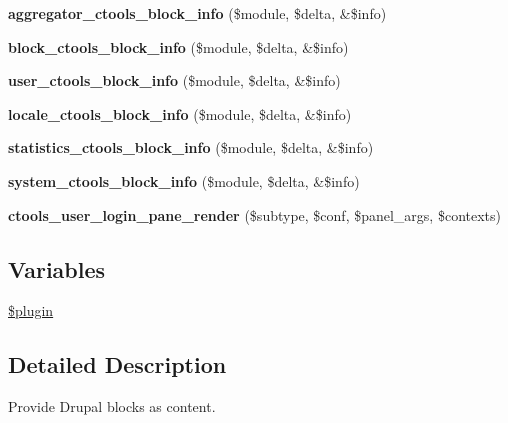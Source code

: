 \begin{DoxyCompactItemize}
\item 
\hypertarget{block_8inc_a992d4d1318e320a5face6478927e9ada}{
{\bfseries aggregator\_\-ctools\_\-block\_\-info} (\$module, \$delta, \&\$info)}
\label{block_8inc_a992d4d1318e320a5face6478927e9ada}

\item 
\hypertarget{block_8inc_a44b0d26408fd7468dee4d327a792536e}{
{\bfseries block\_\-ctools\_\-block\_\-info} (\$module, \$delta, \&\$info)}
\label{block_8inc_a44b0d26408fd7468dee4d327a792536e}

\item 
\hypertarget{block_8inc_a0e3dbebd519d5c357e2981cfcefa7aa4}{
{\bfseries user\_\-ctools\_\-block\_\-info} (\$module, \$delta, \&\$info)}
\label{block_8inc_a0e3dbebd519d5c357e2981cfcefa7aa4}

\item 
\hypertarget{block_8inc_af688dda99180a96d9dc53dd7053c4cf8}{
{\bfseries locale\_\-ctools\_\-block\_\-info} (\$module, \$delta, \&\$info)}
\label{block_8inc_af688dda99180a96d9dc53dd7053c4cf8}

\item 
\hypertarget{block_8inc_ab79ba2247c9ac4956675f43eaeb9eccf}{
{\bfseries statistics\_\-ctools\_\-block\_\-info} (\$module, \$delta, \&\$info)}
\label{block_8inc_ab79ba2247c9ac4956675f43eaeb9eccf}

\item 
\hypertarget{block_8inc_a0cce3317ef2caf17727e6214a3feb2b0}{
{\bfseries system\_\-ctools\_\-block\_\-info} (\$module, \$delta, \&\$info)}
\label{block_8inc_a0cce3317ef2caf17727e6214a3feb2b0}

\item 
\hypertarget{block_8inc_aeadb969e091d2da7e06069b95b033fa8}{
{\bfseries ctools\_\-user\_\-login\_\-pane\_\-render} (\$subtype, \$conf, \$panel\_\-args, \$contexts)}
\label{block_8inc_aeadb969e091d2da7e06069b95b033fa8}

\end{DoxyCompactItemize}
\subsection*{Variables}
\begin{DoxyCompactItemize}
\item 
\hyperlink{block_8inc_ada8a7130088351710bb02ed622d6bf65}{\$plugin}
\end{DoxyCompactItemize}


\subsection{Detailed Description}
Provide Drupal blocks as content.

